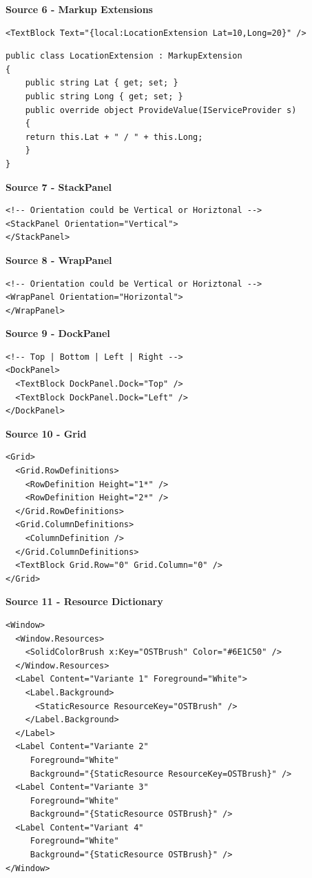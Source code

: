 \documentclass[10pt,twoside,landscape]{article}
\begin{document}
\begin{multicols}{2}
\textbf{Source 6 - Markup Extensions}
\lstset{language=XML,label= ,caption= ,captionpos=b,numbers=none}
\begin{lstlisting}
<TextBlock Text="{local:LocationExtension Lat=10,Long=20}" />
\end{lstlisting}

\lstset{language=csharp,label= ,caption= ,captionpos=b,numbers=none}
\begin{lstlisting}
public class LocationExtension : MarkupExtension
{
    public string Lat { get; set; }
    public string Long { get; set; }
    public override object ProvideValue(IServiceProvider s)
    {
	return this.Lat + " / " + this.Long;
    }
}
\end{lstlisting}

\textbf{Source 7 - StackPanel}
\lstset{language=XML,label= ,caption= ,captionpos=b,numbers=none}
\begin{lstlisting}
<!-- Orientation could be Vertical or Horiztonal -->
<StackPanel Orientation="Vertical">
</StackPanel>
\end{lstlisting}

\textbf{Source 8 - WrapPanel}
\lstset{language=XML,label= ,caption= ,captionpos=b,numbers=none}
\begin{lstlisting}
<!-- Orientation could be Vertical or Horiztonal -->
<WrapPanel Orientation="Horizontal">
</WrapPanel>
\end{lstlisting}

\textbf{Source 9 - DockPanel}
\lstset{language=XML,label= ,caption= ,captionpos=b,numbers=none}
\begin{lstlisting}
<!-- Top | Bottom | Left | Right -->
<DockPanel>
  <TextBlock DockPanel.Dock="Top" />
  <TextBlock DockPanel.Dock="Left" />
</DockPanel>
\end{lstlisting}

\textbf{Source 10 - Grid}
\lstset{language=XML,label= ,caption= ,captionpos=b,numbers=none}
\begin{lstlisting}
<Grid>
  <Grid.RowDefinitions>
    <RowDefinition Height="1*" />
    <RowDefinition Height="2*" />
  </Grid.RowDefinitions>
  <Grid.ColumnDefinitions>
    <ColumnDefinition />
  </Grid.ColumnDefinitions>
  <TextBlock Grid.Row="0" Grid.Column="0" />
</Grid>
\end{lstlisting}

\textbf{Source 11 - Resource Dictionary}
\lstset{language=XML,label= ,caption= ,captionpos=b,numbers=none}
\begin{lstlisting}
<Window>
  <Window.Resources>
    <SolidColorBrush x:Key="OSTBrush" Color="#6E1C50" />
  </Window.Resources>
  <Label Content="Variante 1" Foreground="White">
    <Label.Background>
      <StaticResource ResourceKey="OSTBrush" />
    </Label.Background>
  </Label>
  <Label Content="Variante 2"
	 Foreground="White"
	 Background="{StaticResource ResourceKey=OSTBrush}" />
  <Label Content="Variante 3"
	 Foreground="White"
	 Background="{StaticResource OSTBrush}" />
  <Label Content="Variant 4"
	 Foreground="White"
	 Background="{StaticResource OSTBrush}" />
</Window>
\end{lstlisting}


\end{multicols}
\end{document}
